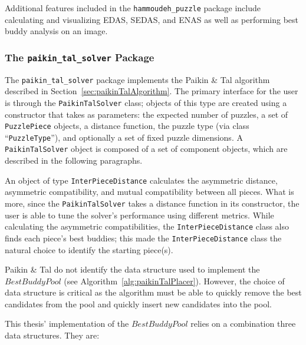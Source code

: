 \documentclass{report}
\newcommand{\hammoudehPuzzlePackage}{\texttt{hammoudeh\_puzzle} }
\newcommand{\paikinTalPackage}{\texttt{paikin\_tal\_solver} }
\begin{document}
Additional features included in the \hammoudehPuzzlePackage package include calculating and visualizing EDAS, SEDAS, and ENAS as well as performing best buddy analysis on an image.

\subsubsection{The \paikinTalPackage Package}\label{sec:paikinTalSolverPackage}

The \paikinTalPackage package implements the Paikin \& Tal algorithm described in Section~\ref{sec:paikinTalAlgorithm}.  The primary interface for the user is through the \texttt{PaikinTalSolver} class; objects of this type are created using a constructor that takes as parameters: the expected number of puzzles, a set of \texttt{PuzzlePiece} objects, a distance function, the puzzle type (via class ``\texttt{PuzzleType}''), and optionally a set of fixed puzzle dimensions.  A \texttt{PaikinTalSolver} object is composed of a set of component objects, which are described in the following paragraphs.

An object of type \texttt{InterPieceDistance} calculates the asymmetric distance, asymmetric compatibility, and mutual compatibility between all pieces.  What is more, since the \texttt{PaikinTalSolver} takes a distance function in its constructor, the user is able to tune the solver's performance using different metrics.  While calculating the asymmetric compatibilities, the \texttt{InterPieceDistance} class also finds each piece's best buddies; this made the \texttt{InterPieceDistance} class the natural choice to identify the starting piece(s).

Paikin \& Tal do not identify the data structure used to implement the $BestBuddyPool$ (see Algorithm~\ref{alg:paikinTalPlacer}). However, the choice of data structure is critical as the algorithm must be able to quickly remove the best candidates from the pool and quickly insert new candidates into the pool.

This thesis' implementation of the $BestBuddyPool$ relies on a combination three data structures.  They are:
\end{document}
